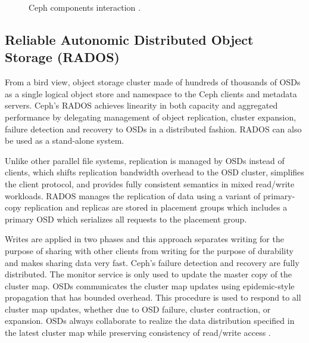 \documentclass[9pt,twocolumn,twoside]{styles/osajnl}
\begin{document}
\begin{figure}[htbp]
\centering
{}
\caption{Ceph components interaction \cite{paper-ceph-hadoop}.}
\label{CCI}
\end{figure}

\subsection{Reliable Autonomic Distributed Object Storage (RADOS)}
From a bird view, object storage cluster made of hundreds of thousands
of OSDs as a single logical object store and namespace to the Ceph
clients and metadata servers. Ceph’s RADOS achieves linearity in both
capacity and aggregated performance by delegating management of object
replication, cluster expansion, failure detection and recovery to OSDs
in a distributed fashion. RADOS can also be used as a stand-alone
system.

Unlike other parallel file systems, replication is managed by OSDs
instead of clients, which shifts replication bandwidth overhead to the
OSD cluster, simplifies the client protocol, and provides fully
consistent semantics in mixed read/write workloads. RADOS manages the
replication of data using a variant of primary-copy replication and
replicas are stored in placement groups which includes a primary OSD
which serializes all requests to the placement group.

Writes are applied in two phases and this approach separates writing
for the purpose of sharing with other clients from writing for the
purpose of durability and makes sharing data very fast. Ceph’s failure
detection and recovery are fully distributed. The monitor service is
only used to update the master copy of the cluster map. OSDs
communicates the cluster map updates using epidemic-style propagation
that has bounded overhead. This procedure is used to respond to all
cluster map updates, whether due to OSD failure, cluster contraction,
or expansion. OSDs always collaborate to realize the data distribution
specified in the latest cluster map while preserving consistency of
read/write access \cite{paper-ceph-hadoop}.
\end{document}
